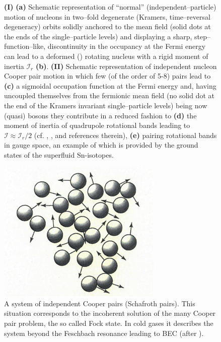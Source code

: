 \begin{figure}
\caption{\textbf{(I)} \textbf{(a)} Schematic representation of ``normal'' (independent--particle) motion of nucleons in  two--fold degenerate (Kramers, time--reversal degeneracy) orbits solidly anchored to the mean field (solid dots at the ends of the single--particle levels) and  displaying a sharp, step--function--like, discontinuity in the occupancy at the Fermi energy can lead to a deformed  (\cite{Nilsson:55}) rotating nucleus with a rigid moment of inertia $\mathcal{I}_r$ \textbf{(b)}. \textbf{(II)} Schematic representation of independent nucleon Cooper pair  motion in which few (of the order of 5-8) pairs lead to \textbf{(c)} a sigmoidal occupation function at the Fermi energy and, having uncoupled themselves from the fermionic mean field (no solid dot at the end of the Kramers invariant single--particle levels) being now (quasi) bosons they   contribute in a reduced fashion to \textbf{(d)} the moment of inertia of quadrupole rotational bands leading to $\mathcal{I}\approx\mathcal{I}_r/2$ (cf. \cite{Belyaev:13}, \cite{Belyaev:59}, \cite{Bohr:75} and references therein), \textbf{(e)} pairing rotational bands in gauge space, an example of which is  provided by the ground states of the superfluid Sn-isotopes.}\label{fig1A3}
\end{figure}
\begin{figure}
\centerline{\includegraphics*[width=0.7\textwidth,angle=0]{nutshell/figs/fig1A4.pdf}}
\caption{A system of independent Cooper pairs (Schafroth pairs). This situation corresponds to the incoherent solution of the many Cooper pair problem, the so called Fock state. In cold gases it describes the system beyond the Feschbach resonance leading to BEC (after \cite{Rogovin:76}).}\label{fig1A4}
\end{figure}
